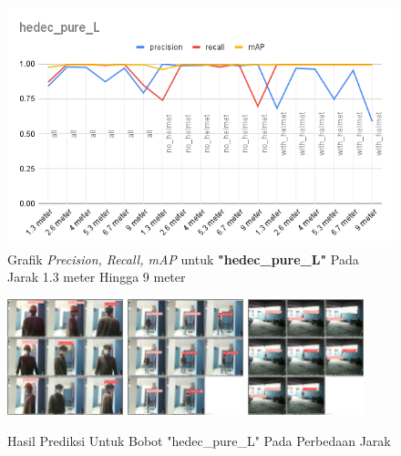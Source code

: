 \begin{enumerate}
  \newpage
  \begin{figure} [h!]
    \centering
    \includegraphics[width=1\textwidth]{gambar/BerdasarkanJarak/hedec_pure_L.png}
    \caption{Grafik \emph{Precision, Recall, mAP} untuk \textbf{"hedec\_pure\_L"} Pada Jarak 1.3 meter Hingga 9 meter}
    \label{fig:grafvaljarak_hedec_pure_L}  
  \end{figure}

  \begin{figure} [h!]
    \centering
    \includegraphics[width=0.3\textwidth]{gambar/BerdasarkanJarak_v2/val_hedec_pure_L/Jarak1_3/val_batch0_pred.jpg}
    \includegraphics[width=0.3\textwidth]{gambar/BerdasarkanJarak_v2/val_hedec_pure_L/Jarak5_3/val_batch0_pred.jpg}
    \includegraphics[width=0.3\textwidth]{gambar/BerdasarkanJarak_v2/val_hedec_pure_L/Jarak9/val_batch0_pred.jpg}
    \caption{Hasil Prediksi Untuk Bobot "hedec\_pure\_L" Pada Perbedaan Jarak}
    \label{fig:valjarak_sample_hedec_pure_L}  
  \end{figure}



\end{enumerate}




